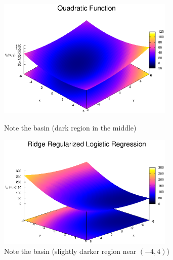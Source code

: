 \documentclass{article}
\begin{document}
\begin{flushleft}
\begin{figure}[H]
\begin{minipage}{0.45\linewidth}
\centering
\includegraphics[width=0.75\textwidth]{./images/quadratic_function}
\caption{Note the basin (dark region in the middle)}
\end{minipage}
\hfill
\begin{minipage}{0.45\linewidth}
\centering
\includegraphics[width=0.75\textwidth]{./images/ridge_regularized_logistic_regression}
\caption{Note the basin (slightly darker region near \((-4, 4)\))}
\end{minipage}
\end{figure}


\end{flushleft}
\end{document}
